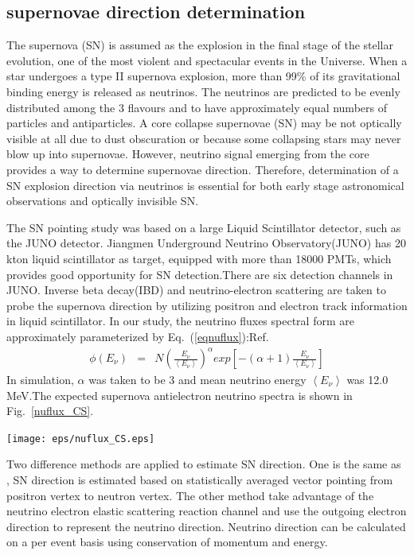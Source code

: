 \documentclass[a4paper,10pt]{cpc-hepnp}
\begin{document}
\subsection{supernovae direction determination }
The supernova (SN) is assumed as the explosion in the final stage of the
stellar evolution, one of the most violent and spectacular events in the Universe.
When a star undergoes a type II supernova explosion, more than 99\% of its
gravitational binding energy is released as neutrinos. The neutrinos are predicted
to be evenly distributed among the 3 flavours and to have approximately equal
numbers of particles and antiparticles. 
A core collapse supernovae (SN) may be not optically visible at all due to
dust obscuration or because some collapsing stars may never blow up into
supernovae. However, neutrino signal emerging from the core provides a way to
determine supernovae direction. Therefore, determination of a SN explosion 
direction via neutrinos is essential for both early stage astronomical
observations and optically invisible SN.

The SN pointing study was based on a large Liquid Scintillator detector, such
as the JUNO detector.
Jiangmen Underground Neutrino Observatory(JUNO) has 20 kton liquid
scintillator as target, equipped with more than 18000 PMTs, which provides good
opportunity for SN detection.There are six detection channels in JUNO.
Inverse beta decay(IBD) and neutrino-electron scattering are taken to probe the
supernova direction by utilizing positron and electron track information in
liquid scintillator. In our study, the neutrino fluxes spectral form are 
approximately parameterized by Eq.~(\ref{eqnuflux}):Ref\cite{nuflux}.
\begin{eqnarray}
\label{eqnuflux}
\phi(E_{\nu}) &=& N\left(\frac{E_{\nu}}{ \left< E_{\nu}\right>}\right)^{\alpha}exp\left[ -(\alpha+1)\frac{E_{\nu}}{ \left< E_{\nu}\right>}\right]
\end{eqnarray}
In simulation, $\alpha$ was taken to be 3 and mean neutrino energy 
$\left< E_{\nu}\right>$ was 12.0 MeV.The expected supernova
antielectron neutrino spectra is shown in Fig.~\ref{nuflux_CS}.
\begin{center}
\texttt{[image: eps/nuflux\_CS.eps]}
\end{center}

Two difference methods are applied to estimate SN direction. 
One is the same as \cite{nudir}, SN direction is estimated based 
on statistically averaged vector pointing from positron vertex
to neutron vertex. %
The other method take advantage of the neutrino electron elastic
scattering reaction channel and use the outgoing electron direction
to represent the neutrino direction. 
Neutrino direction can be calculated on a per event basis using 
conservation of momentum and energy.
\end{document}
